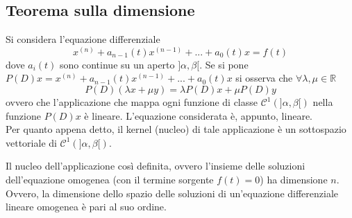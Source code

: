 \documentclass[10pt, oneside]{book}
\theoremstyle{plain}
\begin{document}
\subsection{Teorema sulla dimensione}
Si considera l'equazione differenziale 
\[x^{(n)} + a_{n-1}(t)x^{(n-1)} + ... + a_0(t) x = f(t)\]
dove $a_i(t)$ sono continue su un aperto $]\alpha, \beta[$. Se si pone $P(D)x = x^{(n)} + a_{n-1}(t)x^{(n-1)} + ... + a_0(t) x$ si osserva che $\forall \lambda, \mu \in \mathbb{R}$
\[P(D)(\lambda x + \mu y) = \lambda P(D) x + \mu P(D) y\]
ovvero che l'applicazione che mappa ogni funzione di classe $\mathcal{C}^1(]\alpha, \beta[)$ nella funzione $P(D)x$ è lineare. L'equazione considerata è, appunto, lineare.
\\Per quanto appena detto, il kernel (nucleo) di tale applicazione è un sottospazio vettoriale di $\mathcal{C}^1(]\alpha, \beta[)$.
\begin{ther}
Il nucleo dell'applicazione così definita, ovvero l'insieme delle soluzioni dell'equazione omogenea (con il termine sorgente $f(t) = 0$) ha dimensione $n$. Ovvero, la dimensione dello spazio delle soluzioni di un'equazione differenziale lineare omogenea è pari al suo ordine.
\end{ther}
\end{document}
